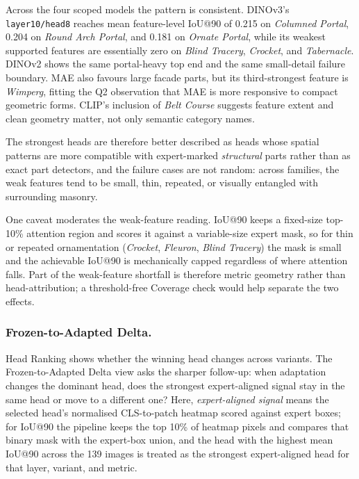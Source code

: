\documentclass{article}
\begin{document}
Across the four scoped models the pattern is consistent. DINOv3's
\texttt{layer10/head8} reaches mean feature-level IoU@90 of 0.215 on
\emph{Columned Portal}, 0.204 on \emph{Round Arch Portal}, and 0.181 on
\emph{Ornate Portal}, while its weakest supported features are essentially
zero on \emph{Blind Tracery}, \emph{Crocket}, and \emph{Tabernacle}. DINOv2
shows the same portal-heavy top end and the same small-detail failure
boundary. MAE also favours large facade parts, but its third-strongest feature
is \emph{Wimperg}, fitting the Q2 observation that MAE is more responsive to
compact geometric forms. CLIP's inclusion of \emph{Belt Course} suggests
feature extent and clean geometry matter, not only semantic category names.

The strongest heads are therefore better described as heads whose spatial
patterns are more compatible with expert-marked \emph{structural} parts rather
than as exact part detectors, and the failure cases are not random: across
families, the weak features tend to be small, thin, repeated, or visually
entangled with surrounding masonry.

One caveat moderates the weak-feature reading. IoU@90 keeps a fixed-size
top-10\% attention region and scores it against a variable-size expert mask,
so for thin or repeated ornamentation (\emph{Crocket}, \emph{Fleuron},
\emph{Blind Tracery}) the mask is small and the achievable IoU@90 is
mechanically capped regardless of where attention falls. Part of the
weak-feature shortfall is therefore metric geometry rather than
head-attribution; a threshold-free Coverage check would help separate the two
effects.

\subsubsection*{Frozen-to-Adapted Delta.}
Head Ranking shows whether the winning head changes across variants. The
Frozen-to-Adapted Delta view asks the sharper follow-up: when adaptation
changes the dominant head, does the strongest expert-aligned signal stay in
the same head or move to a different one? Here, \emph{expert-aligned signal}
means the selected head's normalised CLS-to-patch heatmap scored against
expert boxes; for IoU@90 the pipeline keeps the top 10\% of heatmap pixels
and compares that binary mask with the expert-box union, and the head with the
highest mean IoU@90 across the 139 images is treated as the strongest
expert-aligned head for that layer, variant, and metric.
\end{document}
